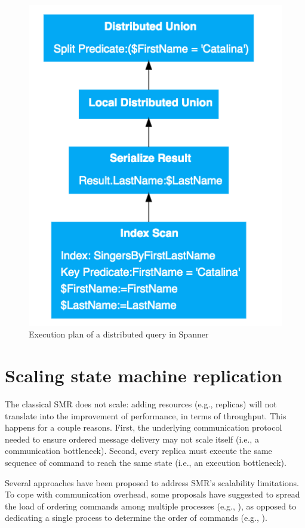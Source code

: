 \begin{figure}
  \begin{minipage}[b]{1.0\linewidth}
  \centering
        \includegraphics[width=0.6\linewidth]{figures/spanner-distributed-query}
  \end{minipage}
  \caption{Execution plan of a distributed query in Spanner}
  \label{fig:spanner-plan}
\end{figure}


\section{Scaling state machine replication}

The classical SMR does not scale: adding resources (e.g., replicas) will not
translate into the improvement of performance, in terms of throughput. This
happens for a couple reasons. First, the underlying communication protocol
needed to ensure ordered message delivery may not scale itself (i.e., a
communication bottleneck). Second, every replica must execute the same sequence
of command to reach the same state (i.e., an execution bottleneck).

Several approaches have been proposed to address SMR's scalability limitations.
To cope with communication overhead, some proposals have suggested to spread the
load of ordering commands among multiple processes (e.g.,
\cite{Moraru:2013gw,Mencius,Marandi:2012hb}), as opposed to dedicating a single
process to determine the order of commands (e.g.,
\cite{Lamport:1998ea}).%


